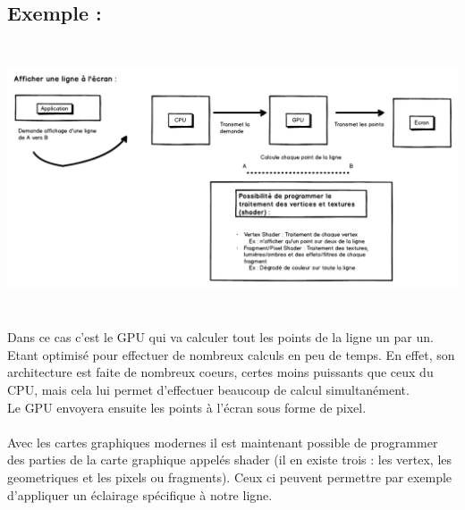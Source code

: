 \subsection{Exemple :}
\begin{center}
\includegraphics[width=15cm,height=8cm]{img/gpuRasterExemple.png}
\end{center}
Dans ce cas c'est le GPU qui va calculer tout les points de la ligne un par un. Etant optimisé pour effectuer de nombreux calculs en peu de temps. En effet, son architecture est faite de nombreux coeurs, certes moins puissants que ceux du CPU, mais cela lui permet d'effectuer beaucoup de calcul simultanément. \\
Le GPU envoyera ensuite les points à l'écran sous forme de pixel. \\\\
Avec les cartes graphiques modernes il est maintenant possible de programmer des parties de la carte graphique appelés shader (il en existe trois : les vertex, les geometriques et les pixels ou fragments). Ceux ci peuvent permettre par exemple d'appliquer un éclairage spécifique à notre ligne.
